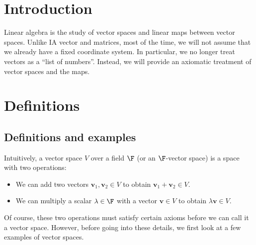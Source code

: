 \documentclass[a4paper]{article}
\begin{document}
\section{Introduction}
Linear algebra is the study of vector spaces and linear maps between vector spaces. Unlike IA vector and matrices, most of the time, we will not assume that we already have a fixed coordinate system. In particular, we no longer treat vectors as a ``list of numbers''. Instead, we will provide an axiomatic treatment of vector spaces and the maps.

\section{Definitions}
\subsection{Definitions and examples}
Intuitively, a vector space $V$ over a field $\F$ (or an $\F$-vector space) is a space with two operations:
\begin{itemize}
  \item We can add two vectors $\mathbf{v}_1, \mathbf{v}_2 \in V$ to obtain $\mathbf{v}_1 + \mathbf{v}_2 \in V$.
  \item We can multiply a scalar $\lambda \in \F$ with a vector $\mathbf{v}\in V$ to obtain $\lambda \mathbf{v} \in V$.
\end{itemize}

Of course, these two operations must satisfy certain axioms before we can call it a vector space. However, before going into these details, we first look at a few examples of vector spaces.
\end{document}
